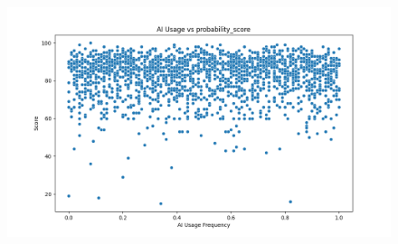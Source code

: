 \documentclass[manuscript,screen,review]{acmart}
\begin{document}
\begin{figure}[H]
\begin{minipage}{0.3\textwidth}
    \end{minipage}\hfill
    \begin{minipage}{0.3\textwidth}
        \centering
        \includegraphics[width=\linewidth]{../results/probability_score_ai_correlation.png} %
    \end{minipage}

    \vspace{0.5cm} %


\end{figure}
\end{document}
